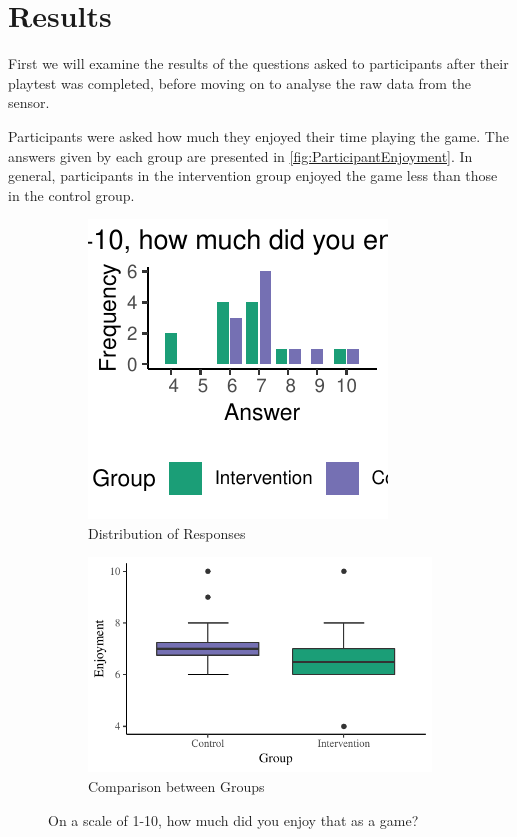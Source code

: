 \documentclass[12pt,a4paper]{article}\usepackage[]{graphicx}\usepackage[]{color}
\makeatletter
\def\maxwidth{ %
  \ifdim\Gin@nat@width>\linewidth
    \linewidth
  \else
    \Gin@nat@width
  \fi
}
\makeatother
\begin{document}
\section{Results}

First we will examine the results of the questions asked to participants after their playtest was completed, before moving on to analyse the raw data from the sensor.

Participants were asked how much they enjoyed their time playing the game.
The answers given by each group are presented in \vref{fig:ParticipantEnjoyment}.
In general, participants in the intervention group enjoyed the game less than those in the control group.

\begin{figure}[htb]
  \centering
  \begin{subfigure}[t]{.49\linewidth}


{\centering \includegraphics[width=\maxwidth]{figure/ParticipantEnjoyment-1} 

}



  	\caption{Distribution of Responses}
  \end{subfigure}
  \begin{subfigure}[t]{.49\linewidth}


{\centering \includegraphics[width=\maxwidth]{figure/ParticipantEnjoymentBoxPlot-1} 

}



  	\caption{Comparison between Groups}
  \end{subfigure}
  \caption{On a scale of 1-10, how much did you enjoy that as a game?}
  \label{fig:ParticipantEnjoyment}
\end{figure}
\end{document}
